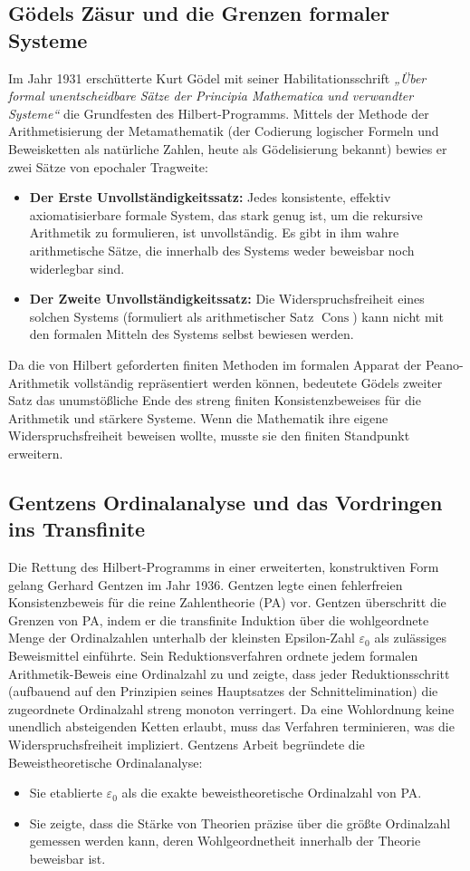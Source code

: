 \documentclass[11pt,a4paper]{article}
\begin{document}
	\subsection{Gödels Zäsur und die Grenzen formaler Systeme}
	Im Jahr 1931 erschütterte Kurt Gödel mit seiner Habilitationsschrift \textit{„Über formal unentscheidbare Sätze der Principia Mathematica und verwandter Systeme“} die Grundfesten des Hilbert-Programms. Mittels der Methode der Arithmetisierung der Metamathematik (der Codierung logischer Formeln und Beweisketten als natürliche Zahlen, heute als Gödelisierung bekannt) bewies er zwei Sätze von epochaler Tragweite:
	\begin{itemize}
		\item \textbf{Der Erste Unvollständigkeitssatz:} Jedes konsistente, effektiv axiomatisierbare formale System, das stark genug ist, um die rekursive Arithmetik zu formulieren, ist unvollständig. Es gibt in ihm wahre arithmetische Sätze, die innerhalb des Systems weder beweisbar noch widerlegbar sind.
		\item \textbf{Der Zweite Unvollständigkeitssatz:} Die Widerspruchsfreiheit eines solchen Systems (formuliert als arithmetischer Satz $\operatorname{Cons}$) kann nicht mit den formalen Mitteln des Systems selbst bewiesen werden.
	\end{itemize}
	Da die von Hilbert geforderten finiten Methoden im formalen Apparat der Peano-Arithmetik vollständig repräsentiert werden können, bedeutete Gödels zweiter Satz das unumstößliche Ende des streng finiten Konsistenzbeweises für die Arithmetik und stärkere Systeme. Wenn die Mathematik ihre eigene Widerspruchsfreiheit beweisen wollte, musste sie den finiten Standpunkt erweitern.
	
	\subsection{Gentzens Ordinalanalyse und das Vordringen ins Transfinite}
	Die Rettung des Hilbert-Programms in einer erweiterten, konstruktiven Form gelang Gerhard Gentzen im Jahr 1936. Gentzen legte einen fehlerfreien Konsistenzbeweis für die reine Zahlentheorie (PA) vor.
	Gentzen überschritt die Grenzen von PA, indem er die transfinite Induktion über die wohlgeordnete Menge der Ordinalzahlen unterhalb der kleinsten Epsilon-Zahl $\varepsilon_0$ als zulässiges Beweismittel einführte. Sein Reduktionsverfahren ordnete jedem formalen Arithmetik-Beweis eine Ordinalzahl zu und zeigte, dass jeder Reduktionsschritt (aufbauend auf den Prinzipien seines Hauptsatzes der Schnittelimination) die zugeordnete Ordinalzahl streng monoton verringert. Da eine Wohlordnung keine unendlich absteigenden Ketten erlaubt, muss das Verfahren terminieren, was die Widerspruchsfreiheit impliziert.
	Gentzens Arbeit begründete die Beweistheoretische Ordinalanalyse:
	\begin{itemize}
		\item Sie etablierte $\varepsilon_0$ als die exakte beweistheoretische Ordinalzahl von PA.
		\item Sie zeigte, dass die Stärke von Theorien präzise über die größte Ordinalzahl gemessen werden kann, deren Wohlgeordnetheit innerhalb der Theorie beweisbar ist.
	\end{itemize}
	
\end{document}
